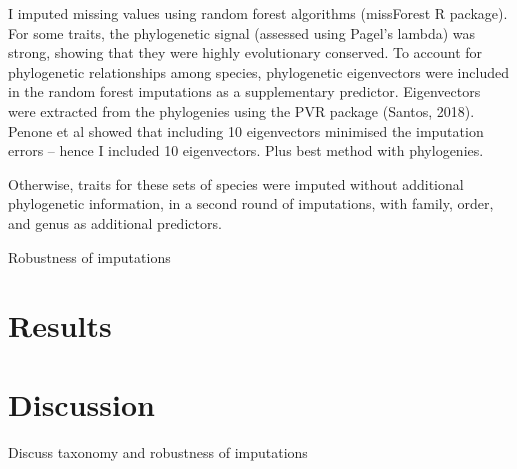 I imputed missing values using random forest algorithms (missForest R package). For some traits, the phylogenetic signal (assessed using Pagel’s lambda) was strong, showing that they were highly evolutionary conserved. To account for phylogenetic relationships among species, phylogenetic eigenvectors were included in the random forest imputations as a supplementary predictor. Eigenvectors were extracted from the phylogenies using the PVR package (Santos, 2018). Penone et al showed that including 10 eigenvectors minimised the imputation errors – hence I included 10 eigenvectors. Plus best method with phylogenies.

Otherwise, traits for these sets of species were imputed without additional phylogenetic information, in a second round of imputations, with family, order, and genus as additional predictors.

Robustness of imputations

\section{Results}


\section{Discussion}
Discuss taxonomy and robustness of imputations

